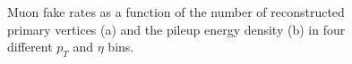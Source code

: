 \begin{figure}[!htbp]
\begin{center}
\caption{Muon fake rates as a function of the number of reconstructed primary vertices (a) 
and the pileup energy density (b) in four different $p_{T}$ and $\eta$ bins.}
\label{fig:mu_fr_PileupDependence}
\end{center}
\end{figure}  



